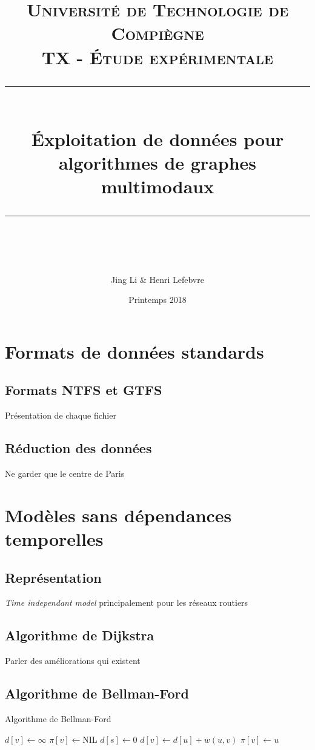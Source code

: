 \documentclass[a4paper,11pt]{article}
\title{
\normalfont \normalsize
\textsc{Université de Technologie de Compiègne\\
TX - Étude expérimentale} \\
[10pt]
\rule{\linewidth}{0.5pt} \\[6pt]
\huge Éxploitation de données pour algorithmes de graphes multimodaux \\
\rule{\linewidth}{0.5pt}  \\[10pt]
}
\author{Jing Li \& Henri Lefebvre}
\date{\normalsize Printemps 2018}
\begin{document}
\maketitle
\noindent
\tableofcontents
\newpage

\section{Formats de données standards}
\subsection{Formats NTFS et GTFS}
Présentation de chaque fichier
\subsection{Réduction des données}
Ne garder que le centre de Paris

\section{Modèles sans dépendances temporelles}
\subsection{Représentation}
\textit{Time independant model} principalement pour les réseaux routiers
\subsection{Algorithme de Dijkstra}
Parler des améliorations qui existent
\subsection{Algorithme de Bellman-Ford}
\begin{algorithm}[H]
  \caption{Algorithme de Bellman-Ford}\label{bellman}
  \begin{algorithmic}[1]
      \Statex{}
        \State $d[v]\gets\infty$
        \State $\pi[v]\gets$NIL
      \EndFor
      \State $d[s]\gets 0$
      \Statex{}
            \State $d[v]\gets d[u]+w(u,v)$
            \State $\pi[v]\gets u$
          \EndIf
        \EndFor
      \EndFor
      \Statex
    \EndProcedure
  \end{algorithmic}
\end{algorithm}
\end{document}
